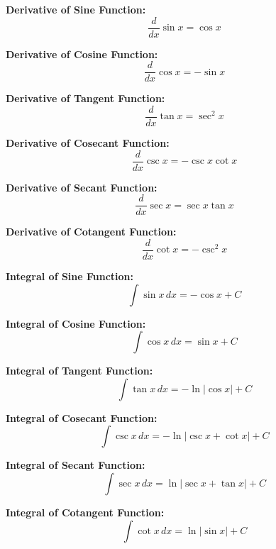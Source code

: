 \documentclass{article}
\begin{document}
\textbf{Derivative of Sine Function:}
\[
\frac{d}{dx} \sin x = \cos x
\]

\textbf{Derivative of Cosine Function:}
\[
\frac{d}{dx} \cos x = -\sin x
\]

\textbf{Derivative of Tangent Function:}
\[
\frac{d}{dx} \tan x = \sec^2 x
\]

\textbf{Derivative of Cosecant Function:}
\[
\frac{d}{dx} \csc x = -\csc x \cot x
\]

\textbf{Derivative of Secant Function:}
\[
\frac{d}{dx} \sec x = \sec x \tan x
\]

\textbf{Derivative of Cotangent Function:}
\[
\frac{d}{dx} \cot x = -\csc^2 x
\]

\textbf{Integral of Sine Function:}
\[
\int \sin x \, dx = -\cos x + C
\]

\textbf{Integral of Cosine Function:}
\[
\int \cos x \, dx = \sin x + C
\]

\textbf{Integral of Tangent Function:}
\[
\int \tan x \, dx = -\ln|\cos x| + C
\]

\textbf{Integral of Cosecant Function:}
\[
\int \csc x \, dx = -\ln|\csc x + \cot x| + C
\]

\textbf{Integral of Secant Function:}
\[
\int \sec x \, dx = \ln|\sec x + \tan x| + C
\]

\textbf{Integral of Cotangent Function:}
\[
\int \cot x \, dx = \ln|\sin x| + C
\]
\end{document}
